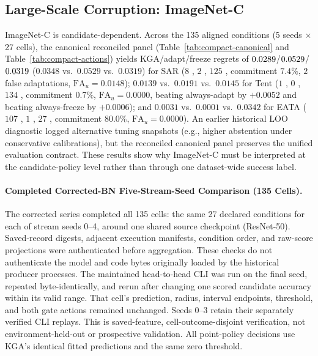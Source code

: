 \subsection{Large-Scale Corruption: ImageNet-C}
\label{app:sar-official-controls}

ImageNet-C is candidate-dependent. Across the 135 aligned conditions (5 seeds $\times$ 27 cells), the canonical reconciled panel (Table~\ref{tab:compact-canonical} and Table~\ref{tab:compact-actions}) yields KGA/adapt/freeze regrets of $0.0289$/$0.0529$/$0.0319$ ($0.0348$ vs.\ $0.0529$ vs.\ $0.0319$) for SAR ($8$ \adapt, $2$ \freeze, $125$ \abstain, commitment $7.4\%$, $2$ false adaptations, $\mathrm{FA}_u = 0.0148$); $0.0139$ vs.\ $0.0191$ vs.\ $0.0145$ for Tent ($1$ \adapt, $0$ \freeze, $134$ \abstain, commitment $0.7\%$, $\mathrm{FA}_u = 0.0000$, beating always-adapt by $+0.0052$ and beating always-freeze by $+0.0006$); and $0.0031$ vs.\ $0.0001$ vs.\ $0.0342$ for EATA ($107$ \adapt, $1$ \freeze, $27$ \abstain, commitment $80.0\%$, $\mathrm{FA}_u = 0.0000$). An earlier historical LOO diagnostic logged alternative tuning snapshots (e.g., higher abstention under conservative calibrations), but the reconciled canonical panel preserves the unified evaluation contract. These results show why ImageNet-C must be interpreted at the candidate-policy level rather than through one dataset-wide success label.

\paragraph{Completed Corrected-BN Five-Stream-Seed Comparison (135 Cells).}
The corrected series completed all 135 cells: the same 27 declared conditions for each of stream
seeds 0--4, around one shared source checkpoint (ResNet-50). Saved-record digests, adjacent execution
manifests, condition order, and raw-score projections were authenticated before aggregation. These checks
do not authenticate the model and code bytes originally loaded by the historical producer processes.
The maintained head-to-head CLI was run on the final seed, repeated byte-identically, and rerun after
changing one scored candidate accuracy within its valid range. That cell's prediction, radius,
interval endpoints, threshold, and both gate actions remained unchanged. Seeds 0--3 retain their separately
verified CLI replays. This is saved-feature, cell-outcome-disjoint verification, not environment-held-out
or prospective validation. All point-policy decisions use KGA's identical fitted predictions and the same
zero threshold.

